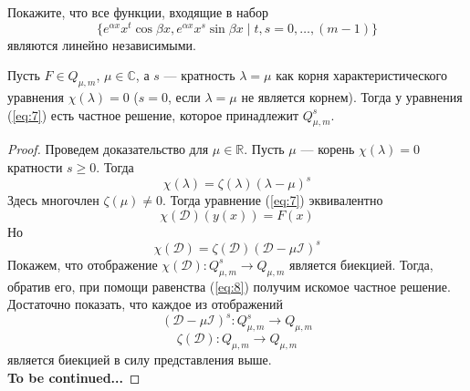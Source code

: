 \documentclass[11pt]{article}
\begin{document}
\begin{exercise}
    Покажите, что все функции, входящие в набор
    \[\{e^{\alpha x} x^t \cos \beta x, e^{\alpha x} x^s \sin \beta x \; | \; t, s = 0, \ldots, (m - 1)\}\]
    являются линейно независимыми.
\end{exercise}

\begin{theorem}
    Пусть $F \in Q_{\mu, m}$, $\mu \in \mathbb{C}$, а $s$ --- кратность $\lambda = \mu$ как корня характеристического уравнения $\chi(\lambda) = 0$ ($s = 0$, если $\lambda = \mu$ не является корнем). Тогда у уравнения (\ref{eq:7}) есть частное решение, которое принадлежит $Q_{\mu, m}^s$.
\end{theorem}

\begin{proof}
    Проведем доказательство для $\mu \in \mathbb{R}$. Пусть $\mu$ --- корень $\chi(\lambda) = 0$ кратности $s \geq 0$. Тогда
    \[\chi(\lambda) = \zeta(\lambda)(\lambda - \mu)^s\]
    Здесь многочлен $\zeta(\mu) \neq 0$. Тогда уравнение (\ref{eq:7}) эквивалентно
    \[\tag{8} \label{eq:8} \chi(\mathcal{D})(y(x)) = F(x)\]
    Но
    \[\chi(\mathcal{D}) = \zeta(\mathcal{D})(\mathcal{D} - \mu \mathcal{I})^s\]
    Покажем, что отображение $\chi(\mathcal{D}) \colon Q_{\mu, m}^s \to Q_{\mu, m}$ является биекцией. Тогда, обратив его, при помощи равенства (\ref{eq:8}) получим искомое частное решение. \\
    Достаточно показать, что каждое из отображений 
    \[(\mathcal{D} - \mu \mathcal{I})^s \colon Q_{\mu, m}^s \to Q_{\mu, m}\]
    \[\zeta(\mathcal{D}) \colon Q_{\mu, m} \to Q_{\mu, m}\]
    является биекцией в силу представления выше. \\
    \textbf{To be continued...}
\end{proof}
\end{document}
